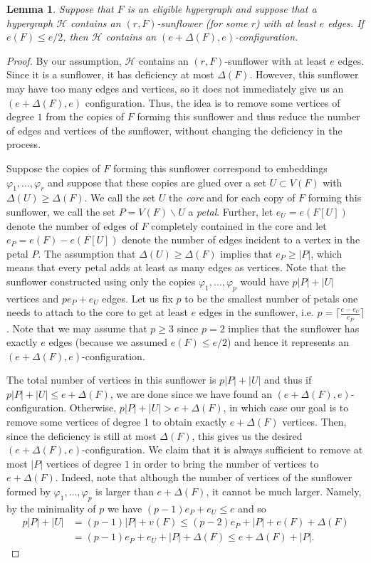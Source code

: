 \documentclass[11pt]{article}
\numberwithin{equation}{section}
\def\cH{\mathcal{H}}
\theoremstyle{plain}
\newtheorem{lemma}[theorem]{Lemma}
\theoremstyle{remark}
\begin{document}
\begin{lemma}\label{lemma:sunflower}
Suppose that $F$ is an eligible hypergraph and suppose that a hypergraph $\cH$ contains an $(r, F)$-sunflower (for some $r$) with at least $e$ edges. If $e(F)\leq e/2$, then $\cH$ contains an $(e+\Delta(F), e)$-configuration.
\end{lemma}
\begin{proof}
By our assumption, $\cH$ contains an $(r, F)$-sunflower with at least $e$ edges. Since it is a sunflower, it has deficiency at most $\Delta(F)$. However, this sunflower may have too many edges and vertices, so it does not immediately give us an $(e+\Delta(F), e)$ configuration. Thus, the idea is to remove some vertices of degree $1$ from the copies of $F$ forming this sunflower and thus reduce the number of edges and vertices of the sunflower, without changing the deficiency in the process.

Suppose the copies of $F$ forming this sunflower correspond to embeddings $\varphi_1, \dots, \varphi_r$ and suppose that these copies are glued over a set $U\subset V(F)$ with $\Delta(U)\geq \Delta(F)$. We call the set $U$ the \textit{core} and  for each copy of $F$ forming this sunflower, we call the set $P=V(F)\backslash U$ a \textit{petal}. Further, let $e_U=e(F[U])$ denote the number of edges of $F$ completely contained in the core and let $e_P=e(F)-e(F[U])$ denote the number of edges incident to a vertex in the petal $P$. The assumption that $\Delta(U)\geq \Delta(F)$ implies that $e_P\geq |P|$, which means that every petal adds at least as many edges as vertices. Note that the sunflower constructed using only the copies $\varphi_1, \dots, \varphi_p$ would have $p|P|+|U|$ vertices and $pe_P+e_U$ edges. Let us fix $p$ to be the smallest number of petals one needs to attach to the core to get at least $e$ edges in the sunflower, i.e. $p=\lceil\frac{e-e_U}{e_P}\rceil$. Note that we may assume that $p\geq 3$ since $p=2$ implies that the sunflower has exactly $e$ edges (because we assumed $e(F) \le e/2$) and hence it represents an $( e+\Delta(F), e)$-configuration.

The total number of vertices in this sunflower is $p|P|+|U|$ and thus if $p|P|+|U|\leq e+\Delta(F)$, we are done since we have found an $(e+\Delta(F), e)$-configuration. Otherwise, $p|P|+|U|> e+\Delta(F)$, in which case our goal is to remove some vertices of degree 1 to obtain exactly $e+\Delta(F)$ vertices. Then, since the deficiency is still at most $\Delta(F)$, this gives us the desired $(e+\Delta(F), e)$-configuration. We claim that it is always sufficient to remove at most $|P|$ vertices of degree $1$ in order to bring the number of vertices to $e+\Delta(F)$. Indeed, note that although the number of vertices of the sunflower formed by $\varphi_1, \dots, \varphi_p$ is larger than $e+\Delta(F)$, it cannot be much larger. Namely, by the minimality of $p$ we have $(p-1) e_P+e_U\leq e$ and so 
\begin{align*}
    p|P|+|U|&= (p-1)|P|+ v(F)\leq (p-2)e_P + |P| + e(F)+\Delta(F)\\
    &= (p-1)e_P+e_U+|P|+\Delta(F)\leq e+\Delta(F)+|P|.
\end{align*}


\end{proof}
\end{document}
